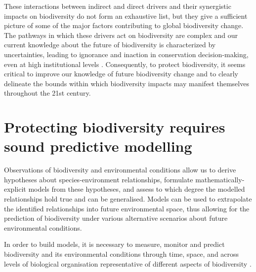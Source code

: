 \documentclass[titlesmallcaps,copyrightpage]{uomthesis}\usepackage[]{graphicx}\usepackage[]{color}
\begin{document}
These interactions between indirect and direct drivers and their synergistic impacts on biodiversity do not form an exhaustive list, but they give a sufficient picture of some of the major factors contributing to global biodiversity change. The pathways in which these drivers act on biodiversity are complex and our current knowledge about the future of biodiversity is characterized by uncertainties, leading to ignorance and inaction in conservation decision-making, even at high institutional levels \citep{voigt2019international}. Consequently, to protect biodiversity, it seems critical to improve our knowledge of future biodiversity change and to clearly delineate the bounds within which biodiversity impacts may manifest themselves throughout the 21st century.


\section{Protecting biodiversity requires sound predictive modelling}

Observations of biodiversity and environmental conditions allow us to derive hypotheses about species-environment relationships, formulate mathematically-explicit models from these hypotheses, and assess to which degree the modelled relationships hold true and can be generalised. Models can be used to extrapolate the identified relationships into future environmental space, thus allowing for the prediction of biodiversity under various alternative scenarios about future environmental conditions. 

In order to build models, it is necessary to measure, monitor and predict biodiversity and its environmental conditions through time, space, and across levels of biological organisation representative of different aspects of biodiversity \citep[from genetic diversity to ecosystem function,][]{kissling_building_2017, ipbes_summary_2016}.
\end{document}
